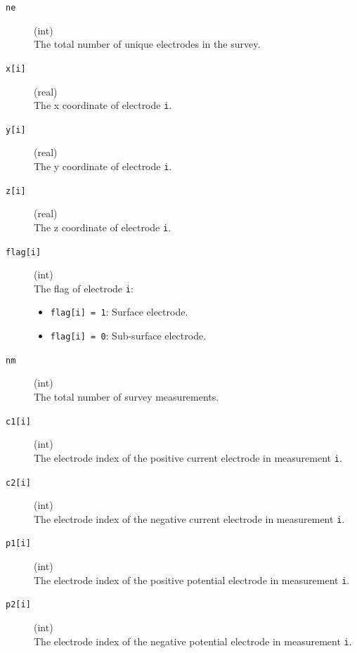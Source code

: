 \documentclass[a4paper,12pt]{article}
\begin{document}
\begin{description}
    \item[\texttt{ne}] (int)\hfill \\
          The total number of unique electrodes in the survey.

    \item[\texttt{x[i]}] (real)\hfill \\
          The x coordinate of electrode \texttt{i}.

    \item[\texttt{y[i]}] (real)\hfill \\
          The y coordinate of electrode \texttt{i}.

    \item[\texttt{z[i]}] (real)\hfill \\
          The z coordinate of electrode \texttt{i}.

    \item[\texttt{flag[i]}] (int)\hfill \\
          The flag of electrode \texttt{i}:
          \begin{itemize}
              \item \texttt{flag[i] = 1}: Surface electrode.
              \item \texttt{flag[i] = 0}: Sub-surface electrode.
          \end{itemize}

    \item[\texttt{nm}] (int)\hfill \\
          The total number of survey measurements.

    \item[\texttt{c1[i]}] (int)\hfill \\
          The electrode index of the positive current electrode in measurement \texttt{i}.

    \item[\texttt{c2[i]}] (int)\hfill \\
          The electrode index of the negative current electrode in measurement \texttt{i}.

    \item[\texttt{p1[i]}] (int)\hfill \\
          The electrode index of the positive potential electrode in measurement \texttt{i}.

    \item[\texttt{p2[i]}] (int)\hfill \\
          The electrode index of the negative potential electrode in measurement \texttt{i}.


\end{description}
\end{document}
